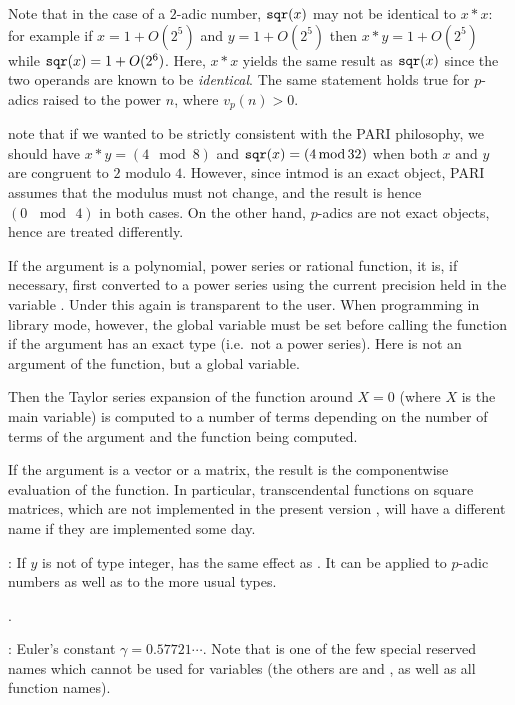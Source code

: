Note that in the case of a $2$-adic number, ${\tt sqr}(x)$ may not be
identical to $x*x$: for example if $x = 1+O(2^5)$ and $y = 1+O(2^5)$ then
$x*y = 1+O(2^5)$ while ${\tt sqr}(x) = 1+O(2^6)$. Here, $x * x$ yields the
same result as ${\tt sqr}(x)$ since the two operands are known to be
\emph{identical}. The same statement holds true for $p$-adics raised to the
power $n$, where $v_p(n) > 0$.

 note that if we wanted to be strictly consistent with
the PARI philosophy, we should have $x*y = (4 \mod 8)$ and ${\tt sqr}(x) =
(4 \,{\rm mod}\, 32)$ when both $x$ and $y$ are congruent to $2$ modulo $4$.
However, since intmod is an exact object, PARI assumes that the modulus
must not change, and the result is hence $(0\, \mod\, 4)$ in both cases. On
the other hand, $p$-adics are not exact objects, hence are treated
differently.

\item If the argument is a polynomial, power series or rational function,
it is, if necessary, first converted to a power series using the current
precision held in the variable . Under  this again is
transparent to the user. When programming in library mode, however, the
global variable  must be set before calling the function if the
argument has an exact type (i.e.~not a power series). Here  is
not an argument of the function, but a global variable.

Then the Taylor series expansion of the function around $X=0$ (where $X$ is
the main variable) is computed to a number of terms depending on the number
of terms of the argument and the function being computed.

\item If the argument is a vector or a matrix, the result is the
componentwise evaluation of the function. In particular, transcendental
functions on square matrices, which are not implemented in the present
version \vers, will have a different name if they are implemented some day.

\subseckbd{\pow}: If $y$ is not of type integer,  has the same
effect as . It can be applied to $p$-adic numbers as well
as to the more usual types.

.

: Euler's constant $\gamma=0.57721\cdots$. Note that
 is one of the few special reserved names which cannot be used for
variables (the others are  and , as well as all function
names). \label{se:euler}


